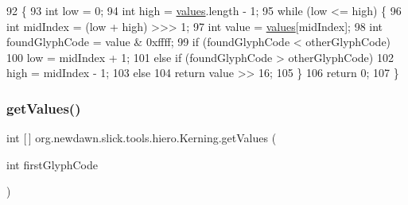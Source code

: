 \begin{DoxyCode}
92                                                              \{
93         \textcolor{keywordtype}{int} low = 0;
94         \textcolor{keywordtype}{int} high = \mbox{\hyperlink{classorg_1_1newdawn_1_1slick_1_1tools_1_1hiero_1_1_kerning_a2fb8954e8eb2c071e18a4e14b19ce352}{values}}.length - 1;
95         \textcolor{keywordflow}{while} (low <= high) \{
96             \textcolor{keywordtype}{int} midIndex = (low + high) >>> 1;
97             \textcolor{keywordtype}{int} value = \mbox{\hyperlink{classorg_1_1newdawn_1_1slick_1_1tools_1_1hiero_1_1_kerning_a2fb8954e8eb2c071e18a4e14b19ce352}{values}}[midIndex];
98             \textcolor{keywordtype}{int} foundGlyphCode = value & 0xffff;
99             \textcolor{keywordflow}{if} (foundGlyphCode < otherGlyphCode)
100                 low = midIndex + 1;
101             \textcolor{keywordflow}{else} \textcolor{keywordflow}{if} (foundGlyphCode > otherGlyphCode)
102                 high = midIndex - 1;
103             \textcolor{keywordflow}{else}
104                 \textcolor{keywordflow}{return} value >> 16;
105         \}
106         \textcolor{keywordflow}{return} 0;
107     \}
\end{DoxyCode}
\mbox{\label{classorg_1_1newdawn_1_1slick_1_1tools_1_1hiero_1_1_kerning_aeff28298520b6c43eca3c2031679993c}} 
\subsubsection{\texorpdfstring{get\+Values()}{getValues()}}
{\footnotesize\ttfamily int \mbox{[}$\,$\mbox{]} org.\+newdawn.\+slick.\+tools.\+hiero.\+Kerning.\+get\+Values (\begin{DoxyParamCaption}\item[{int}]{first\+Glyph\+Code }\end{DoxyParamCaption})\hspace{0.3cm}{\ttfamily [inline]}}

